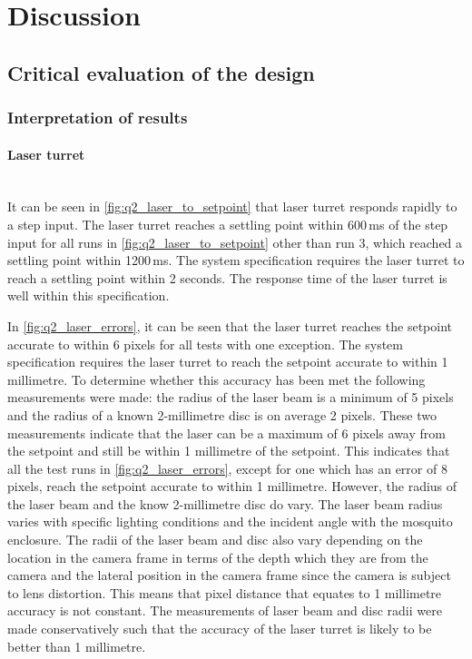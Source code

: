 
\section{Discussion}

\subsection{Critical evaluation of the design}

\subsubsection{Interpretation of results}
\paragraph{Laser turret}\hfill\\
It can be seen in \autoref{fig:q2_laser_to_setpoint} that laser turret responds rapidly to a step input. The laser turret reaches a settling point within 600\,ms of the step input for all runs in \autoref{fig:q2_laser_to_setpoint} other than run 3, which reached a settling point within 1200\,ms. The system specification requires the laser turret to reach a settling point within 2 seconds. The response time of the laser turret is well within this specification.

In \autoref{fig:q2_laser_errors}, it can be seen that the laser turret reaches the setpoint accurate to within 6 pixels for all tests with one exception. The system specification requires the laser turret to reach the setpoint accurate to within 1 millimetre. To determine whether this accuracy has been met the following measurements were made: the radius of the laser beam is a minimum of 5 pixels and the radius of a known 2-millimetre disc is on average 2 pixels. These two measurements indicate that the laser can be a maximum of 6 pixels away from the setpoint and still be within 1 millimetre of the setpoint. This indicates that all the test runs in \autoref{fig:q2_laser_errors}, except for one which has an error of 8 pixels, reach the setpoint accurate to within 1 millimetre. However, the radius of the laser beam and the know 2-millimetre disc do vary. The laser beam radius varies with specific lighting conditions and the incident angle with the mosquito enclosure. The radii of the laser beam and disc also vary depending on the location in the camera frame in terms of the depth which they are from the camera and the lateral position in the camera frame since the camera is subject to lens distortion. This means that pixel distance that equates to 1 millimetre accuracy is not constant. The measurements of laser beam and disc radii were made conservatively such that the accuracy of the laser turret is likely to be better than 1 millimetre.

